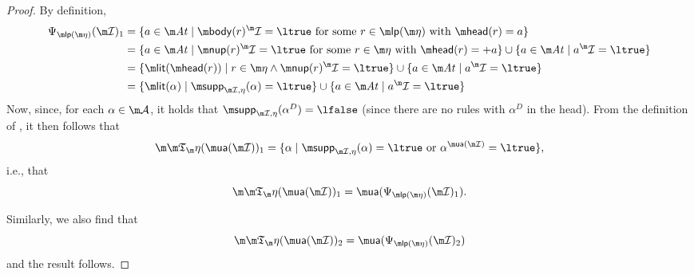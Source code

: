 \begin{proof}
  By definition,
  \begin{align*}
    \Psi_{\lpop(\aics)}(\pstruct)_1 &= \{a\in\atoms \mid \body(r)^\pstruct=\ltrue \mbox{ for some $r\in\lpop(\aics)$ with $\head(r)=a$}\} \\
    &= \{a\in\atoms \mid \nup(r)^\pstruct=\ltrue \mbox{ for some $r\in\aics$ with $\head(r)=+a$}\}\cup\{a\in\atoms\mid a^\pstruct=\ltrue\} \\
    &= \{\litof(\head(r)) \mid r\in\aics\land\nup(r)^\pstruct=\ltrue\}\cup\{a\in\atoms\mid a^\pstruct=\ltrue\}\\
    &= \{\litof(\alpha) \mid \supp_{\pstruct,\eta}(\alpha) = \ltrue \}\cup\{a\in\atoms\mid a^\pstruct=\ltrue\}
  \end{align*}
  Now, since, for each $\alpha \in \acts$, it holds that $\supp_{\pstruct,\eta}(\alpha^D) = \lfalse$ (since there are no rules with $\alpha^D$ in the head). 
  From the definition of \Ap, it then follows that
  \[ 
\Ap(\actof(\pstruct))_1 = \{\alpha \mid     \supp_{\pstruct,\eta}(\alpha) = \ltrue \text{ or } \alpha^{\actof(\pstruct)}=\ltrue\},
  \]
  i.e., that 
  \[\Ap(\actof(\pstruct))_1 =  \actof(\Psi_{\lpop(\aics)}(\pstruct)_1 ).\]
  
  Similarly, we also find that 
    \[\Ap(\actof(\pstruct))_2 =  \actof(\Psi_{\lpop(\aics)}(\pstruct)_2 )\]
    and the result follows. \qedhere
% 
\end{proof}
